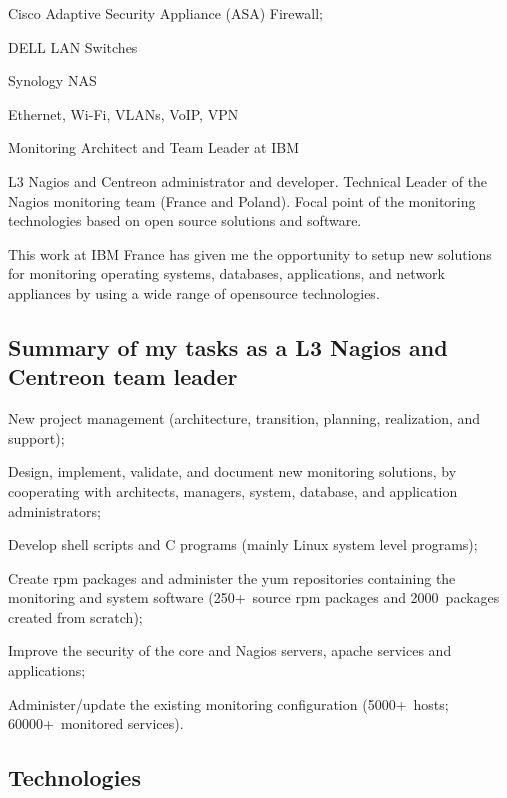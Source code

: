 \item{\bdot} Cisco Adaptive Security Appliance (ASA) Firewall;
\item{\bdot} DELL LAN Switches
\item{\bdot} Synology NAS
\item{\bdot} Ethernet, Wi-Fi, VLANs, VoIP, VPN


\bigskip
{}
{Monitoring Architect and Team Leader at IBM}

\noindent
L3 Nagios and Centreon administrator and developer.
Technical Leader of the Nagios monitoring team (France and Poland).
Focal point of the monitoring technologies based on open source solutions and
software.

This work at IBM France has given me the opportunity to setup new solutions 
for monitoring operating systems, databases, applications, and network 
appliances by using a wide range of opensource technologies.

\subsection{Summary of my tasks as a L3 Nagios and Centreon team leader}

\item{\bdot} New project management (architecture, transition, planning, 
   realization, and support);
\item{\bdot} Design, implement, validate, and document new monitoring solutions,
   by cooperating with architects, managers, system, database, and application 
   administrators;
\item{\bdot} Develop shell scripts and C programs (mainly Linux system level
   programs);
\item{\bdot} Create rpm packages and administer the yum repositories containing
   the monitoring and system software (250+~source rpm packages and  
   2000~packages created from scratch);
\item{\bdot} Improve the security of the core and Nagios servers, apache 
   services and applications;
\item{\bdot} Administer/update the existing monitoring configuration 
   (5000+~hosts; 60000+~monitored services).

\subsection{Technologies}

